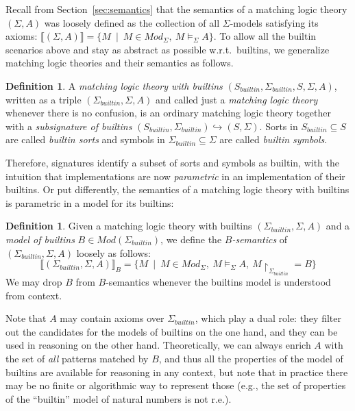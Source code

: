 \documentclass[UTF8,11pt]{article}
\newcounter{thmcounter}
\theoremstyle{plain}
\theoremstyle{definition}
\newtheorem{definition} [thmcounter]{Definition}
\theoremstyle{remark}
\newcommand{\Mod}{\textit{Mod}}
\newcommand{\denote}[1]{\llbracket{#1}\rrbracket}
\newcommand{\reduct}[2]{\mbox{${#1}\!\!\upharpoonright_{#2}$}}
\newcommand{\builtin}{\textit{builtin}}
\begin{document}
Recall from Section~\ref{sec:semantics} that the semantics of a matching
logic theory $(\Sigma,A)$ was loosely defined as the collection of all
$\Sigma$-models satisfying its axioms: $\denote{(\Sigma,A)} =
\{M \ \mid \ M \in \Mod_{\Sigma},\ M \models_{\Sigma} A \}$.
To allow all the builtin scenarios above and stay as abstract as possible
w.r.t.~builtins, we generalize matching logic theories and their semantics
as follows.

\begin{definition}
A \emph{matching logic theory with builtins}
$(S_\builtin,\Sigma_\builtin,S,\Sigma,A)$, written as a triple
$(\Sigma_\builtin,\Sigma,A)$ and
called just a \emph{matching logic theory} whenever there is no confusion,
is an ordinary matching logic theory together with a
\emph{subsignature of builtins}
$(S_\builtin,\Sigma_\builtin)\hookrightarrow(S,\Sigma)$.
Sorts in $S_\builtin \subseteq S$ are called \emph{builtin sorts} and symbols in
$\Sigma_\builtin \subseteq \Sigma$ are called \emph{builtin symbols}.
\end{definition}

Therefore, signatures identify a subset of sorts and symbols as builtin,
with the intuition that implementations are now \emph{parametric} in an
implementation of their builtins.
Or put differently, the semantics of a matching logic theory with builtins
is parametric in a model for its builtins:

\begin{definition}
Given a matching logic theory with builtins $(\Sigma_\builtin,\Sigma,A)$ and
a \emph{model of builtins} $B \in \Mod(\Sigma_\builtin)$, we define
the \emph{$B$-semantics} of $(\Sigma_\builtin,\Sigma,A)$ loosely as follows:
$$
\denote{(\Sigma_\builtin,\Sigma,A)}_B = 
\{M \ \mid \ M \in \Mod_{\Sigma},\ M \models_{\Sigma} A,\ \reduct{M}{\Sigma_\builtin} = B \}
$$
We may drop $B$ from $B$-semantics whenever the builtins model is
understood from context.
\end{definition}

Note that $A$ may contain axioms over $\Sigma_\builtin$, which play a dual
role: they filter out the candidates for the models of builtins on the one
hand, and they can be used in reasoning on the other hand.
Theoretically, we can always enrich $A$ with the set of \emph{all} patterns
matched by $B$, and thus all the properties of the model of builtins are
available for reasoning in any context, but note that in practice there may
be no finite or algorithmic way to represent those
(e.g., the set of properties of the ``builtin'' model of natural numbers is
not r.e.).
\end{document}
